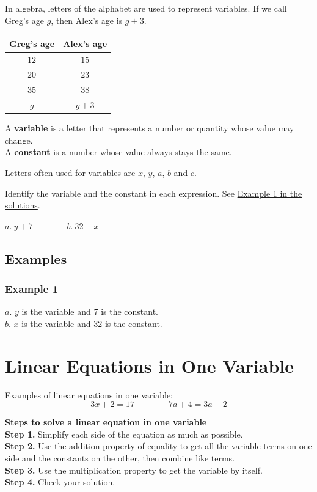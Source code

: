 \documentclass[letter]{article}
\newenvironment{keybox}
  {\begin{lrbox}{\keyboxsave}\begin{minipage}{\dimexpr\linewidth-2\fboxsep-2\fboxrule\relax}}
  {\end{minipage}\end{lrbox}\par\noindent\fbox{\usebox{\keyboxsave}}\par}
\newcommand{\exbox}[1]{\fbox{\textbf{Example #1}}}
\newcommand{\chp}{}
\newcommand{\solsec}[1]{\phantomsection\label{sec:\chp ex#1}\subsubsection*{Example #1}}
\newcommand{\seesol}[1]{See \hyperref[sec:\chp ex#1]{Example #1 in the solutions}.}
\begin{document}
In algebra, letters of the alphabet are used to represent variables. If we call Greg's age $g$, then Alex's age is $g+3$.

\begin{center}
\begin{tabular}{c|c}
Greg's age & Alex's age\\\hline
$12$ & $15$\\
$20$ & $23$\\
$35$ & $38$\\
$g$ & $g+3$
\end{tabular}
\end{center}

\begin{keybox}
A \textbf{variable} is a letter that represents a number or quantity whose value may change.\\
A \textbf{constant} is a number whose value always stays the same.
\end{keybox}

Letters often used for variables are $x$, $y$, $a$, $b$ and $c$.

\exbox{1} Identify the variable and the constant in each expression. \seesol{1}
\begin{center}
$a.\ y+7\qquad\qquad b.\ 32-x$
\end{center}

\pagebreak
\subsection{Examples}

\solsec{1}
$a.$ $y$ is the variable and $7$ is the constant.\\
$b.$ $x$ is the variable and $32$ is the constant.
\clearpage
\def\chp{lin1}
\lfoot{}
\section{Linear Equations in One Variable}
Examples of linear equations in one variable:
\[3x+2=17\qquad\qquad7a+4=3a-2\]

\begin{keybox}
\textbf{Steps to solve a linear equation in one variable}\\
\textbf{Step 1.} Simplify each side of the equation as much as possible.\\
\textbf{Step 2.} Use the addition property of equality to get all the variable terms on one side and the constants on the other, then combine like terms.\\
\textbf{Step 3.} Use the multiplication property to get the variable by itself.\\
\textbf{Step 4.} Check your solution.
\end{keybox}
\end{document}
